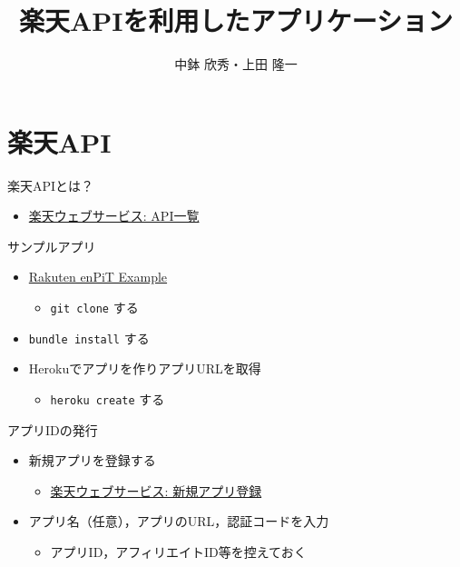 \documentclass[t]{beamer}
\institute[AIIT]{産業技術大学院大学(AIIT)}
\author{中鉢 欣秀・上田 隆一}
\date{}
\title{楽天APIを利用したアプリケーション}
\begin{document}
\maketitle

\section{楽天API}
\label{sec-1}
\begin{frame}[label=sec-1-1]{楽天APIとは？}
\begin{itemize}
\item \href{http://webservice.rakuten.co.jp/document/}{楽天ウェブサービス: API一覧}
\end{itemize}
\end{frame}

\begin{frame}[fragile,label=sec-1-2]{サンプルアプリ}
 \begin{itemize}
\item \href{https://github.com/ryuichiueda/rakuten_enpit_example}{Rakuten enPiT Example}
\begin{itemize}
\item \texttt{git clone} する
\end{itemize}
\item \texttt{bundle install} する
\item Herokuでアプリを作りアプリURLを取得
\begin{itemize}
\item \texttt{heroku create} する
\end{itemize}
\end{itemize}
\end{frame}

\begin{frame}[label=sec-1-3]{アプリIDの発行}
\begin{itemize}
\item 新規アプリを登録する
\begin{itemize}
\item \href{https://webservice.rakuten.co.jp/app/create}{楽天ウェブサービス: 新規アプリ登録}
\end{itemize}
\item アプリ名（任意），アプリのURL，認証コードを入力
\begin{itemize}
\item アプリID，アフィリエイトID等を控えておく
\end{itemize}
\end{itemize}
\end{frame}
\end{document}
